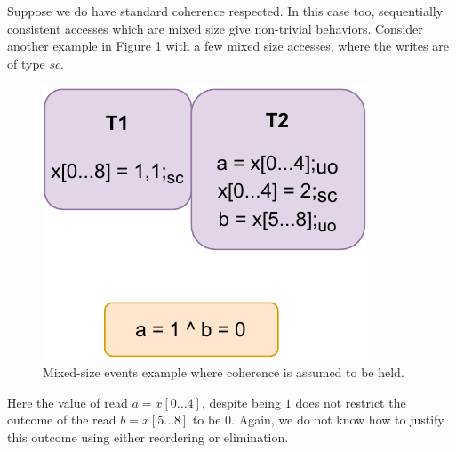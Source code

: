         Suppose we do have standard coherence respected. 
        In this case too, sequentially consistent accesses which are mixed size give non-trivial behaviors.
        Consider another example in Figure \ref{crit:coherence_mixed} with a few mixed size accesses, where the writes are of type $sc$.
        \begin{figure}[H]
            \centering
            \includegraphics[scale=0.7]{6.ConclusionFutureWork/CoherenceMixed.pdf}
            \caption{Mixed-size events example where coherence is assumed to be held.}
            \label{crit:coherence_mixed}
        \end{figure}

        Here the value of read $a=x[0...4]$, despite being $1$ does not restrict the outcome of the read $b=x[5...8]$ to be $0$. 
        Again, we do not know how to justify this outcome using either reordering or elimination. 
